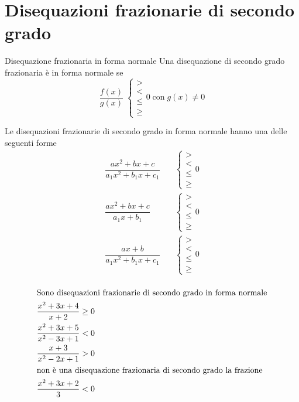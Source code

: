 \section{Disequazioni frazionarie di secondo grado}
\begin{definizionet}{Disequazione frazionaria in forma normale}{}
	Una disequazione di secondo grado frazionaria è in forma normale se \[\dfrac{f(x)}{g(x)}\;\begin{cases}
	>\\
	<\\
	\leq\\
	\geq
	\end{cases} 0\; \text{con}\; g(x)\neq 0\]
\end{definizionet}
\begin{osservazionet}{}{}
	Le disequazioni frazionarie di secondo grado in forma normale hanno  una delle seguenti forme
	\begin{align*}
	\dfrac{ax^2+bx+c}{a_1x^2+b_1x+c_1}&\quad\begin{cases}
	>\\
	<\\
	\leq\\
	\geq
	\end{cases} 0\\
	\dfrac{ax^2+bx+c}{a_1x+b_1}&\quad\begin{cases}
	>\\
	<\\
	\leq\\
	\geq
	\end{cases} 0\\
	\dfrac{ax+b}{a_1x^2+b_1x+c_1}&\quad\begin{cases}
	>\\
	<\\
	\leq\\
	\geq
	\end{cases} 0\\
	\end{align*}
	\end{osservazionet} 
\begin{osservazionet}{}{}
\begin{align*}
\intertext{Sono disequazioni frazionarie di secondo grado in forma normale}
&\dfrac{x^2+3x+4}{x+2}\geq 0\\
&\dfrac{x^2+3x+5}{x^2-3x+1}<0\\
&\dfrac{x+3}{x^2-2x+1}>0\\
\intertext{non è una disequazione frazionaria di secondo grado la frazione}
&\dfrac{x^2+3x+2}{3}<0\\
\end{align*}
\end{osservazionet}

